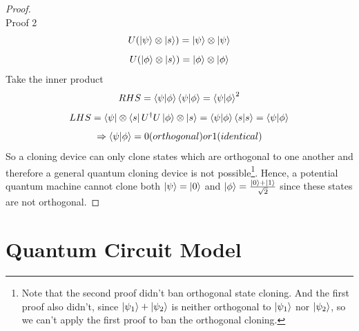 \documentclass[]{book}
\theoremstyle{nonumberplain}
\begin{document}
\begin{itemize}
\begin{proof}
\[\] 
Proof 2
\[
	U(\ket{\psi}\otimes\ket{s}) = \ket{\psi}\otimes \ket{\psi}
\] 
\[
	U(\ket{\phi}\otimes\ket{s}) = \ket{\phi}\otimes \ket{\phi}
\] 
Take the inner product
\[
RHS = \braket{\psi|\phi}\braket{\psi|\phi} = \braket{\psi|\phi}^{2}
\]
\[
LHS = \bra{\psi}\otimes\bra{s}U^{\dagger}U\ket{\phi}\otimes\ket{s} = \braket{\psi|\phi}\braket{s|s} = \braket{\psi|\phi}
\]
\[
\Rightarrow \braket{\psi|\phi} = 0 (orthogonal) or 1 (identical)
\]
So a cloning device can only clone states which are orthogonal to one another and therefore a general quantum cloning device is not possible\footnote{Note that the second proof didn't ban orthogonal state cloning. And the first proof also didn't, since $\ket{\psi_1}+\ket{\psi_2}$ is neither orthogonal to $\ket{\psi_1}$ nor $\ket{\psi_2}$, so we can't apply the first proof to ban the orthogonal cloning.}. Hence, a potential quantum machine cannot clone both $\ket{\psi}=\ket{0}$ and $\ket{\phi}=\frac{\ket{0}+\ket{1}}{\sqrt{2}}$ since these states are not orthogonal.
\end{proof}
\end{itemize}

\section{Quantum Circuit Model}
\end{document}
